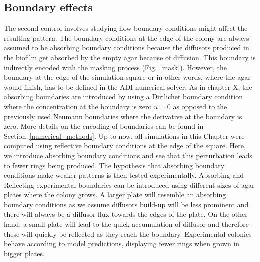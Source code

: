 \subsection{Boundary effects}
The second control involves studying how boundary conditions might affect the resulting pattern.
The boundary conditions at the edge of the colony are always assumed to be absorbing boundary conditions because the diffusors produced in the biofilm get absorbed by the empty agar because of diffusion.
This boundary is indirectly encoded with the masking process (Fig.~\ref{mask}).
However, the boundary at the edge of the simulation square or in other words, where the agar would finish, has to be defined in the ADI numerical solver.
As in chapter X, the absorbing boundaries are introduced by using a Dirilichet boundary condition where the concentration at the boundary is zero $u=0$ as opposed to the previously used Neumann boundaries where the derivative at the boundary is zero.
More details on the encoding of boundaries can be found in Section~\ref{numerical_methods}.
Up to now, all simulations in this Chapter were computed using reflective boundary conditions at the edge of the square.
Here, we introduce absorbing boundary conditions and see that this perturbation leads to fewer rings being produced.
The hypothesis that absorbing boundary conditions make weaker patterns is then tested experimentally.
Absorbing and Reflecting experimental boundaries can be introduced using different sizes of agar plates where the colony grows.
A larger plate will resemble an absorbing boundary conditions as we assume diffusors build-up will be less prominent and there will always be a diffusor flux towards the edges of the plate.
On the other hand, a small plate will lead to the quick accumulation of diffusor and therefore these will quickly be reflected as they reach the boundary. %
Experimental colonies behave according to model predictions, displaying fewer rings when grown in bigger plates.


